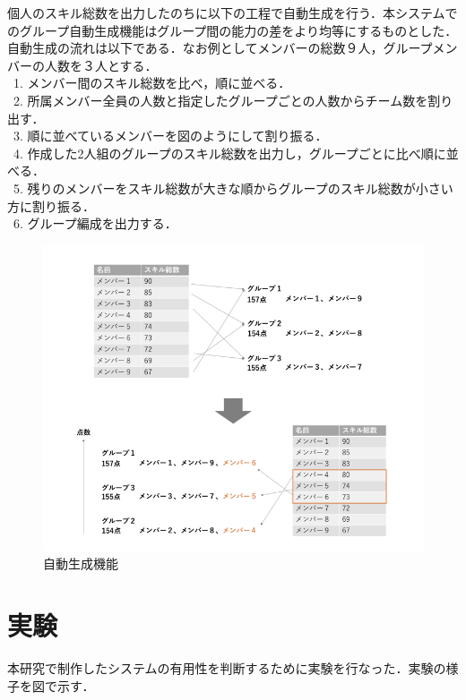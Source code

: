 \documentclass{funthesis}
\begin{document}
個人のスキル総数を出力したのちに以下の工程で自動生成を行う．本システムでのグループ自動生成機能はグループ間の能力の差をより均等にするものとした．自動生成の流れは以下である．なお例としてメンバーの総数９人，グループメンバーの人数を３人とする．\\
\ 1. メンバー間のスキル総数を比べ，順に並べる．\\
\ 2. 所属メンバー全員の人数と指定したグループごとの人数からチーム数を割り出す．\\
\ 3. 順に並べているメンバーを図のようにして割り振る．\\
\ 4. 作成した2人組のグループのスキル総数を出力し，グループごとに比べ順に並べる．\\
\ 5. 残りのメンバーをスキル総数が大きな順からグループのスキル総数が小さい方に割り振る．\\
\ 6. グループ編成を出力する．\\
\begin{figure}[h]
 \centering
   \includegraphics[width=150mm]{figures/auto.png}
 \caption{自動生成機能}
 \label{auto}
\end{figure}





\chapter{実験}
本研究で制作したシステムの有用性を判断するために実験を行なった．実験の様子を図で示す．
\end{document}
